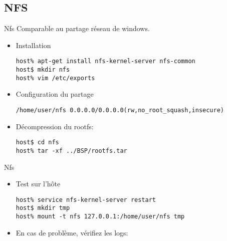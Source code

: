 \subsection{NFS}

\begin{frame}[fragile=singleslide]{Nfs}
  Comparable au partage réseau de windows.
  \begin{itemize}
  \item Installation
    \begin{lstlisting}
host% apt-get install nfs-kernel-server nfs-common
host$ mkdir nfs
host% vim /etc/exports
    \end{lstlisting} %
  \item Configuration du partage
    \begin{lstlisting}
/home/user/nfs 0.0.0.0/0.0.0.0(rw,no_root_squash,insecure)
    \end{lstlisting}
  \item Décompression du rootfs:
    \begin{lstlisting}
host$ cd nfs
host% tar -xf ../BSP/rootfs.tar
    \end{lstlisting} %
  \end{itemize}
\end{frame}

\begin{frame}[fragile=singleslide]{Nfs}
  \begin{itemize}
    \item Test sur l'hôte
      \begin{lstlisting}
host% service nfs-kernel-server restart
host$ mkdir tmp
host% mount -t nfs 127.0.0.1:/home/user/nfs tmp
      \end{lstlisting} %
     \item En cas de problème, vérifiez les logs: 
   \end{itemize}
\end{frame}

